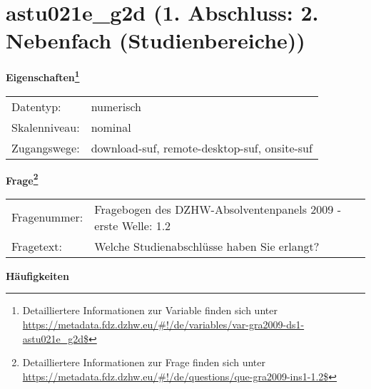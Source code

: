 
    \setcounter{footnote}{0}

    \vspace*{-1.8cm}
	\section{astu021e\_g2d (1. Abschluss: 2. Nebenfach (Studienbereiche))}
	\label{section:astu021e_g2d}



    \vspace*{0.5cm}
    \noindent\textbf{Eigenschaften\footnote{Detailliertere Informationen zur Variable finden sich unter
		\url{https://metadata.fdz.dzhw.eu/\#!/de/variables/var-gra2009-ds1-astu021e_g2d$}}}\\
	\begin{tabularx}{\hsize}{@{}lX}
	Datentyp: & numerisch \\
	Skalenniveau: & nominal \\
	Zugangswege: &
	  download-suf, 
	  remote-desktop-suf, 
	  onsite-suf
 \\
    \end{tabularx}



				\vspace*{0.5cm}
                \noindent\textbf{Frage\footnote{Detailliertere Informationen zur Frage finden sich unter
		              \url{https://metadata.fdz.dzhw.eu/\#!/de/questions/que-gra2009-ins1-1.2$}}}\\
				\begin{tabularx}{\hsize}{@{}lX}
					Fragenummer: &
					  Fragebogen des DZHW-Absolventenpanels 2009 - erste Welle:
					  1.2
 \\
					Fragetext: & Welche Studienabschlüsse haben Sie erlangt? \\
				\end{tabularx}





        		\vspace*{0.5cm}
                \noindent\textbf{Häufigkeiten}

